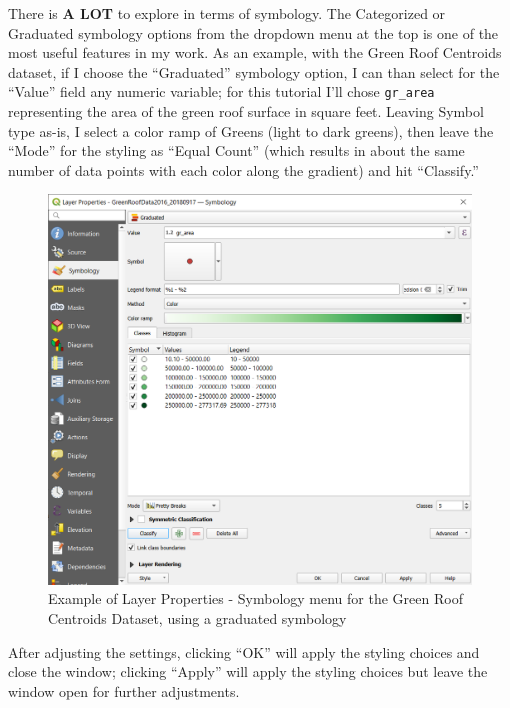 \documentclass[
  letterpaper,
  DIV=11,
  numbers=noendperiod]{scrreprt}
\begin{document}
There is \textbf{A LOT} to explore in terms of symbology. The
Categorized or Graduated symbology options from the dropdown menu at the
top is one of the most useful features in my work. As an example, with
the Green Roof Centroids dataset, if I choose the ``Graduated''
symbology option, I can than select for the ``Value'' field any numeric
variable; for this tutorial I'll chose \texttt{gr\_area} representing
the area of the green roof surface in square feet. Leaving Symbol type
as-is, I select a color ramp of Greens (light to dark greens), then
leave the ``Mode'' for the styling as ``Equal Count'' (which results in
about the same number of data points with each color along the gradient)
and hit ``Classify.''

\begin{figure}

{\centering \includegraphics{./images/point_symbology_2.png}

}

\caption{Example of Layer Properties - Symbology menu for the Green Roof
Centroids Dataset, using a graduated symbology}

\end{figure}

After adjusting the settings, clicking ``OK'' will apply the styling
choices and close the window; clicking ``Apply'' will apply the styling
choices but leave the window open for further adjustments.
\end{document}
